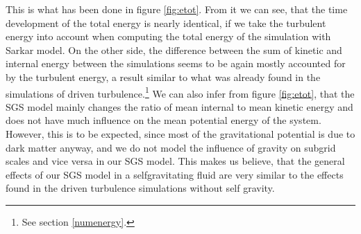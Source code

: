 This is what has been done in figure \ref{fig:etot}. From it we can see,
that the time development of the total energy is nearly identical, if we take
the turbulent energy into account when computing the total energy of the
simulation with Sarkar model. On the other side, the difference between the sum
of kinetic and internal energy between the simulations seems to be again mostly
accounted for by the turbulent energy, a result similar to what was already
found in the simulations of driven turbulence.\footnote{See section
\ref{numenergy}.}
We can also infer from figure \ref{fig:etot}, that the SGS model mainly changes
the ratio of mean internal to mean kinetic energy and does not have much
influence on the mean potential energy of the system. However, this is to be
expected, since most of the gravitational potential is due to dark matter
anyway, and we do not model the influence of gravity on subgrid scales and vice
versa in our SGS model. This makes us believe, that the general effects of our
SGS model in a selfgravitating fluid are very similar to the effects found in
the driven turbulence simulations without self gravity.  


